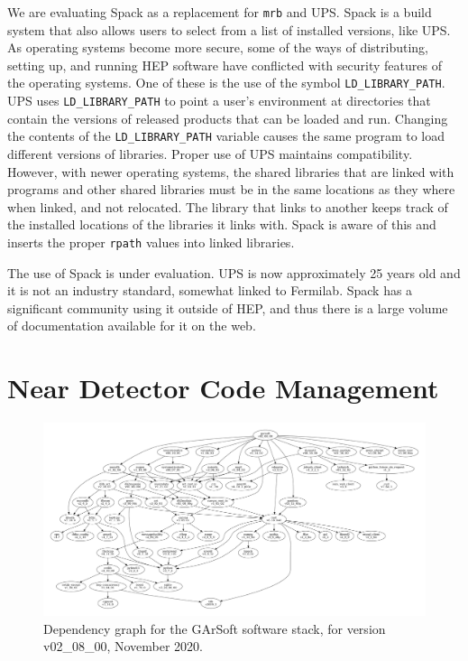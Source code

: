We are evaluating Spack as a replacement for {\tt mrb} and UPS.  Spack is a build system that also allows users to select from a list of installed versions, like UPS.  As operating systems become more secure, some of the ways of distributing, setting up, and running HEP software have conflicted with security features of the operating systems.  One of these is the use of the symbol {\tt LD\_LIBRARY\_PATH}.  UPS uses {\tt LD\_LIBRARY\_PATH} to point a user's environment at directories that contain the versions of released products that can be loaded and run.  Changing the contents of the {\tt LD\_LIBRARY\_PATH} variable causes the same program to load different versions of libraries.  Proper use of UPS maintains compatibility.  However, with newer operating systems, the shared libraries that are linked with programs and other shared libraries must be in the same locations as they where when linked, and not relocated.  The library that links to another keeps track of the installed locations of the libraries it links with.  Spack is aware of this and inserts the proper {\tt rpath} values into linked libraries.

The use of Spack is under evaluation.  UPS is now approximately 25 years old and it is not an industry standard, somewhat linked to Fermilab.  Spack has a significant community using it outside of HEP, and thus there is a large volume of documentation available for it on the web.

\section{Near Detector Code Management}
\label{sec:codemgmt:neardet}  %

\begin{figure}[h]
    \centering
\includegraphics[width=\textwidth]{graphics/CodeManagementFigures/garsoft_v02_08_00_depgraph.pdf}
    \caption{Dependency graph for the GArSoft software stack, for version v02\_08\_00, November 2020.}
    \label{fig:garsoftdeptree}
\end{figure}


